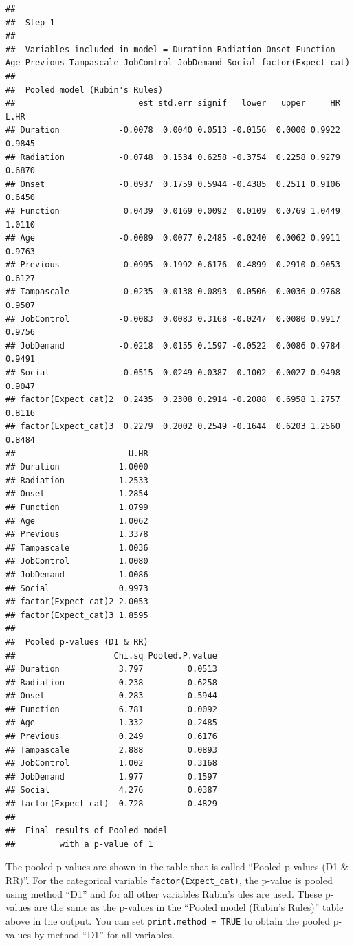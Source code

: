 \documentclass[]{book}
\begin{document}
\begin{verbatim}
## 
##  Step 1 
## 
##  Variables included in model = Duration Radiation Onset Function Age Previous Tampascale JobControl JobDemand Social factor(Expect_cat) 
## 
##  Pooled model (Rubin's Rules) 
##                         est std.err signif   lower   upper     HR   L.HR
## Duration            -0.0078  0.0040 0.0513 -0.0156  0.0000 0.9922 0.9845
## Radiation           -0.0748  0.1534 0.6258 -0.3754  0.2258 0.9279 0.6870
## Onset               -0.0937  0.1759 0.5944 -0.4385  0.2511 0.9106 0.6450
## Function             0.0439  0.0169 0.0092  0.0109  0.0769 1.0449 1.0110
## Age                 -0.0089  0.0077 0.2485 -0.0240  0.0062 0.9911 0.9763
## Previous            -0.0995  0.1992 0.6176 -0.4899  0.2910 0.9053 0.6127
## Tampascale          -0.0235  0.0138 0.0893 -0.0506  0.0036 0.9768 0.9507
## JobControl          -0.0083  0.0083 0.3168 -0.0247  0.0080 0.9917 0.9756
## JobDemand           -0.0218  0.0155 0.1597 -0.0522  0.0086 0.9784 0.9491
## Social              -0.0515  0.0249 0.0387 -0.1002 -0.0027 0.9498 0.9047
## factor(Expect_cat)2  0.2435  0.2308 0.2914 -0.2088  0.6958 1.2757 0.8116
## factor(Expect_cat)3  0.2279  0.2002 0.2549 -0.1644  0.6203 1.2560 0.8484
##                       U.HR
## Duration            1.0000
## Radiation           1.2533
## Onset               1.2854
## Function            1.0799
## Age                 1.0062
## Previous            1.3378
## Tampascale          1.0036
## JobControl          1.0080
## JobDemand           1.0086
## Social              0.9973
## factor(Expect_cat)2 2.0053
## factor(Expect_cat)3 1.8595
## 
##  Pooled p-values (D1 & RR) 
##                    Chi.sq Pooled.P.value
## Duration            3.797         0.0513
## Radiation           0.238         0.6258
## Onset               0.283         0.5944
## Function            6.781         0.0092
## Age                 1.332         0.2485
## Previous            0.249         0.6176
## Tampascale          2.888         0.0893
## JobControl          1.002         0.3168
## JobDemand           1.977         0.1597
## Social              4.276         0.0387
## factor(Expect_cat)  0.728         0.4829
## 
##  Final results of Pooled model
##         with a p-value of 1
\end{verbatim}

The pooled p-values are shown in the table that is called ``Pooled
p-values (D1 \& RR)''. For the categorical variable
\texttt{factor(Expect\_cat)}, the p-value is pooled using method ``D1''
and for all other variables Rubin's ules are used. These p-values are
the same as the p-values in the ``Pooled model (Rubin's Rules)'' table
above in the output. You can set \texttt{print.method\ =\ TRUE} to
obtain the pooled p-values by method ``D1'' for all variables.
\end{document}

